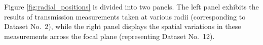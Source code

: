 Figure \ref{fig:radial_positions} is divided into two panels. The left panel exhibits the results of transmission measurements taken at various radii (corresponding to Dataset No.~2), while the right panel displays the spatial variations in these measurements across the focal plane (representing Dataset No.~12).

